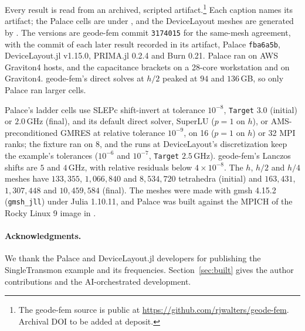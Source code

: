 \documentclass{anvil-paper}
\begin{document}
Every result is read from an archived, scripted artifact.\footnote{The geode-fem source is public at
\url{https://github.com/rjwalters/geode-fem}. Archival DOI to be added at
deposit.}
Each caption names its artifact; the Palace cells are under
, and the DeviceLayout meshes are
generated by . The versions are geode-fem commit
\texttt{3174015} for the same-mesh agreement, with the commit of each later
result recorded in its artifact, Palace \texttt{fba6a5b}, DeviceLayout.jl
v1.15.0, PRIMA.jl 0.2.4 and Burn 0.21. Palace ran on AWS
Graviton4 hosts, and the capacitance brackets on a 28-core workstation and
on Graviton4. geode-fem's
direct solves at $h/2$ peaked at $94$ and $136$\,GB, so only Palace ran
larger cells.

Palace's ladder cells use SLEPc shift-invert at tolerance $10^{-8}$,
\texttt{Target} $3.0$ (initial) or $2.0$\,GHz (final), and its default
direct solver, SuperLU ($p = 1$ on $h$), or AMS-preconditioned GMRES at relative
tolerance $10^{-9}$, on 16 ($p = 1$ on $h$) or 32 MPI ranks; the fixture ran
on 8, and the runs at DeviceLayout's discretization keep the example's
tolerances ($10^{-6}$ and $10^{-7}$, \texttt{Target} $2.5$\,GHz). geode-fem's Lanczos shifts are
$5$ and $4$\,GHz, with relative residuals below $4\times10^{-8}$.
The $h$, $h/2$ and $h/4$ meshes have $133{,}355$, $1{,}066{,}840$ and
$8{,}534{,}720$ tetrahedra (initial) and $163{,}431$, $1{,}307{,}448$ and
$10{,}459{,}584$ (final). The meshes were made
with gmsh 4.15.2 (\texttt{gmsh\_jll}) under Julia 1.10.11, and Palace was
built against the MPICH of the Rocky Linux 9 image in
.

\paragraph{Acknowledgments.}
We thank the Palace and DeviceLayout.jl developers for publishing the
SingleTransmon example and its frequencies. Section~\ref{sec:built} gives
the author contributions and the AI-orchestrated development.



\end{document}
